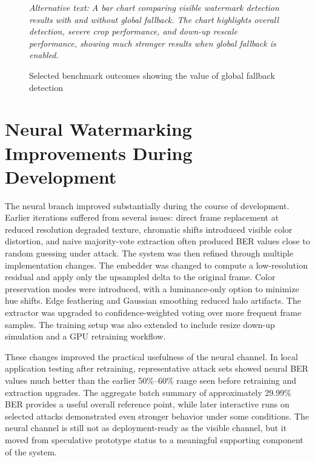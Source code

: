 \documentclass[12pt,oneside]{report}
\newcommand{\AltText}[1]{\par\small\textit{Alternative text: #1}\normalsize}
\begin{document}
\begin{figure}[htbp]
\centering
{}
\caption{Selected benchmark outcomes showing the value of global fallback detection}
\AltText{A bar chart comparing visible watermark detection results with and without global fallback. The chart highlights overall detection, severe crop performance, and down-up rescale performance, showing much stronger results when global fallback is enabled.}
\end{figure}

\section{Neural Watermarking Improvements During Development}
The neural branch improved substantially during the course of development. Earlier iterations suffered from several issues: direct frame replacement at reduced resolution degraded texture, chromatic shifts introduced visible color distortion, and naive majority-vote extraction often produced BER values close to random guessing under attack. The system was then refined through multiple implementation changes. The embedder was changed to compute a low-resolution residual and apply only the upsampled delta to the original frame. Color preservation modes were introduced, with a luminance-only option to minimize hue shifts. Edge feathering and Gaussian smoothing reduced halo artifacts. The extractor was upgraded to confidence-weighted voting over more frequent frame samples. The training setup was also extended to include resize down-up simulation and a GPU retraining workflow.

These changes improved the practical usefulness of the neural channel. In local application testing after retraining, representative attack sets showed neural BER values much better than the earlier 50\%--60\% range seen before retraining and extraction upgrades. The aggregate batch summary of approximately 29.99\% BER provides a useful overall reference point, while later interactive runs on selected attacks demonstrated even stronger behavior under some conditions. The neural channel is still not as deployment-ready as the visible channel, but it moved from speculative prototype status to a meaningful supporting component of the system.
\end{document}
